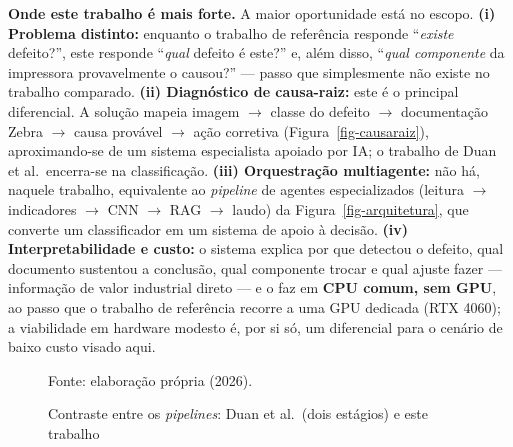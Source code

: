 \documentclass[
	article,			%
	11pt,				%
	oneside,			%
	a4paper,			%
	english,			%
	brazilian,			%
	sumario=tradicional
	]{abntex2}
\begin{document}
\noindent\textbf{Onde este trabalho é mais forte.} A maior oportunidade está no
escopo. \textbf{(i) Problema distinto:} enquanto o trabalho de referência
responde ``\emph{existe} defeito?'', este responde ``\emph{qual} defeito é este?''
e, além disso, ``\emph{qual componente} da impressora provavelmente o causou?''
--- passo que simplesmente não existe no trabalho comparado.
\textbf{(ii) Diagnóstico de causa-raiz:} este é o principal diferencial. A
solução mapeia imagem $\rightarrow$ classe do defeito $\rightarrow$ documentação
Zebra $\rightarrow$ causa provável $\rightarrow$ ação corretiva
(Figura~\ref{fig-causaraiz}), aproximando-se de um sistema especialista apoiado
por IA; o trabalho de Duan et al.\ encerra-se na classificação.
\textbf{(iii) Orquestração multiagente:} não há, naquele trabalho, equivalente ao
\textit{pipeline} de agentes especializados (leitura $\rightarrow$ indicadores
$\rightarrow$ CNN $\rightarrow$ RAG $\rightarrow$ laudo) da
Figura~\ref{fig-arquitetura}, que converte um classificador em um sistema de
apoio à decisão. \textbf{(iv) Interpretabilidade e custo:} o sistema explica por que
detectou o defeito, qual documento sustentou a conclusão, qual componente trocar
e qual ajuste fazer --- informação de valor industrial direto --- e o faz em
\textbf{CPU comum, sem GPU}, ao passo que o trabalho de referência recorre a uma
GPU dedicada (RTX 4060); a viabilidade em hardware modesto é, por si só, um
diferencial para o cenário de baixo custo visado aqui.

\begin{figure}[htb]
\centering
\caption{Contraste entre os \textit{pipelines}: Duan et al.\ (dois estágios) e este trabalho}
\label{fig-pipelines}

\vspace{2pt}
{\footnotesize Fonte: elaboração própria (2026).}
\end{figure}
\end{document}
